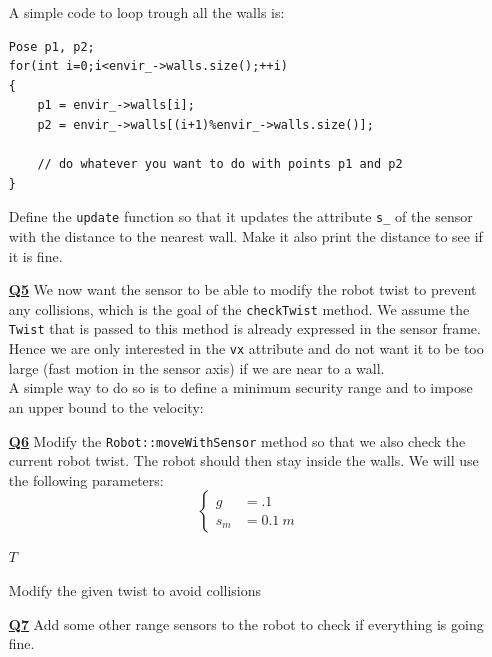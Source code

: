 \documentclass{ecnreport}
\begin{document}
\begin{itemize}
A simple code to loop trough all the walls is:
\begin{center}\cppstyle
\begin{lstlisting}
Pose p1, p2;
for(int i=0;i<envir_->walls.size();++i)
{
    p1 = envir_->walls[i];
    p2 = envir_->walls[(i+1)%envir_->walls.size()];

    // do whatever you want to do with points p1 and p2
}
\end{lstlisting}
\end{center}

Define the \texttt{update} function so that it updates the attribute \texttt{s\_} of the sensor with the distance to the nearest wall. Make it also print the distance to see if it is fine.

\medskip\item[\textbf{\underline{Q5}}] We now want the sensor to be able to modify the robot twist to prevent any collisions, which is the goal of the \texttt{checkTwist} method.
We assume the \texttt{Twist} that is passed to this method is already expressed in the sensor frame. Hence we are only interested in the \texttt{vx} attribute and do not want it to be too large (fast motion in the sensor axis) if we are near to a wall.\\
A simple way to do so is to define a minimum security range and to impose an upper bound to the velocity:

\medskip\item[\textbf{\underline{Q6}}] Modify the \texttt{Robot::moveWithSensor} method so that we also check the current robot twist. The robot should then stay inside the walls. We will use the following parameters:
\begin{equation*}
\left\{\begin{array}{ll}
g &= .1 \\
s_m &= 0.1~ m
\end{array}\right.
\end{equation*}

\begin{algorithm}[!h]
{}
\Return $T$
\caption{Modify the given twist to avoid collisions}
\label{algo:range}
\end{algorithm}
\medskip\item[\textbf{\underline{Q7}}] Add some other range sensors to the robot to check if everything is going fine.
\end{itemize}
\end{document}
